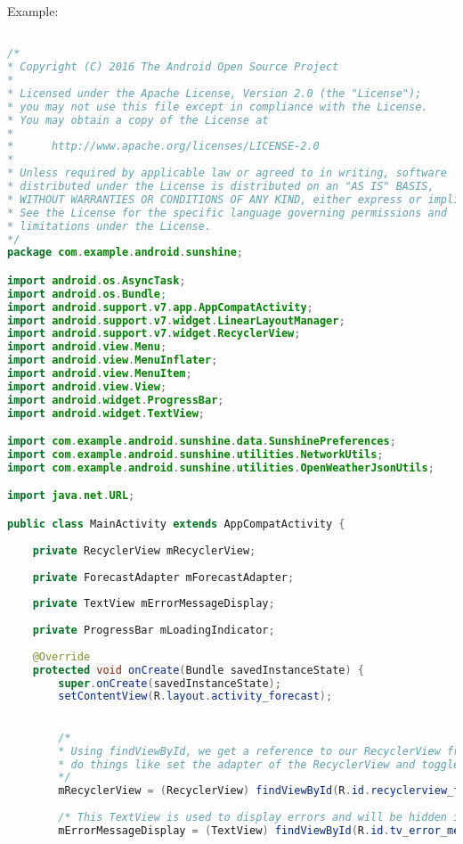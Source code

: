 \documentclass[12pt]{article} %
\begin{document}
Example:

\begin{lstlisting}[language=Java]

/*
* Copyright (C) 2016 The Android Open Source Project
*
* Licensed under the Apache License, Version 2.0 (the "License");
* you may not use this file except in compliance with the License.
* You may obtain a copy of the License at
*
*      http://www.apache.org/licenses/LICENSE-2.0
*
* Unless required by applicable law or agreed to in writing, software
* distributed under the License is distributed on an "AS IS" BASIS,
* WITHOUT WARRANTIES OR CONDITIONS OF ANY KIND, either express or implied.
* See the License for the specific language governing permissions and
* limitations under the License.
*/
package com.example.android.sunshine;

import android.os.AsyncTask;
import android.os.Bundle;
import android.support.v7.app.AppCompatActivity;
import android.support.v7.widget.LinearLayoutManager;
import android.support.v7.widget.RecyclerView;
import android.view.Menu;
import android.view.MenuInflater;
import android.view.MenuItem;
import android.view.View;
import android.widget.ProgressBar;
import android.widget.TextView;

import com.example.android.sunshine.data.SunshinePreferences;
import com.example.android.sunshine.utilities.NetworkUtils;
import com.example.android.sunshine.utilities.OpenWeatherJsonUtils;

import java.net.URL;

public class MainActivity extends AppCompatActivity {
	
	private RecyclerView mRecyclerView;
	
	private ForecastAdapter mForecastAdapter;
	
	private TextView mErrorMessageDisplay;
	
	private ProgressBar mLoadingIndicator;
	
	@Override
	protected void onCreate(Bundle savedInstanceState) {
		super.onCreate(savedInstanceState);
		setContentView(R.layout.activity_forecast);
		

		/*
		* Using findViewById, we get a reference to our RecyclerView from xml. This allows us to
		* do things like set the adapter of the RecyclerView and toggle the visibility.
		*/
		mRecyclerView = (RecyclerView) findViewById(R.id.recyclerview_forecast);
		
		/* This TextView is used to display errors and will be hidden if there are no errors */
		mErrorMessageDisplay = (TextView) findViewById(R.id.tv_error_message_display);
		

\end{lstlisting}
\end{document}

